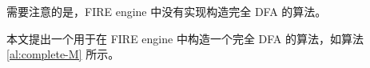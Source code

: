 

需要注意的是，FIRE engine 中没有实现构造完全 DFA 的算法。

本文提出一个用于在 FIRE engine 中构造一个完全 DFA 的算法，如算法 \ref{al:complete-M} 所示。

